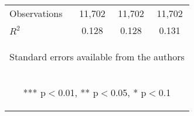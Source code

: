\begin{center}
\begin{tabular}{lccc}
\midrule Observations & 11,702 & 11,702 & 11,702 \\
 $R^2$ & 0.128 & 0.128 & 0.131 \\ \bottomrule
\multicolumn{4}{c}{\begin{footnotesize} Standard errors available from the authors\end{footnotesize}} \\
\multicolumn{4}{c}{\begin{footnotesize} *** p$<$0.01, ** p$<$0.05, * p$<$0.1\end{footnotesize}} \\
\end{tabular}
\end{center}
